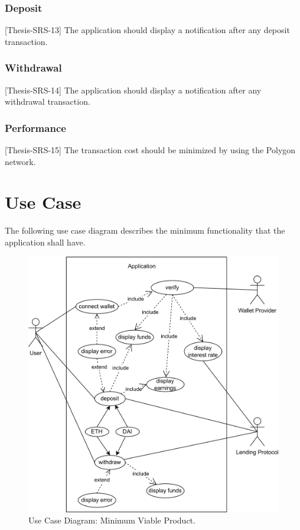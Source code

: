 \documentclass[11pt,a4paper]{report}
\begin{document}
\subsubsection{Deposit}
[Thesis-SRS-13] The application should display a notification after any deposit transaction.
\subsubsection{Withdrawal}
[Thesis-SRS-14] The application should display a notification after any withdrawal transaction.
\subsubsection{Performance}
[Thesis-SRS-15] The transaction cost should be minimized by using the Polygon network.

\newpage
\section{Use Case}
The following use case diagram describes the minimum functionality that the application shall have.

\begin{figure}[htp]
	\centering
	\includegraphics[width=1\textwidth]{./images/USECASE-mvp}
	\caption{Use Case Diagram: Minimum Viable Product.}
	\label{fig:usecase-mvp}
\end{figure}
\newpage
\end{document}
